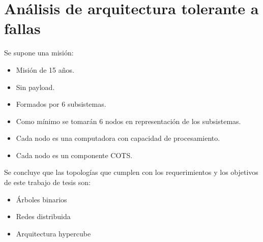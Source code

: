 \section{Análisis de arquitectura tolerante a fallas}
\begin{frame}
	\begin{block}{Se supone una misión:}
		\begin{itemize}
			\item Misión de 15 años. 
			\item Sin payload.
			\item Formados por 6 subsistemas. 
			\item Como mínimo se tomarán 6 nodos en representación de los subsistemas.
			\item Cada nodo es una computadora con capacidad de procesamiento. 
			\item Cada nodo es un componente COTS.
		\end{itemize}
	\end{block}
\end{frame}

\begin{frame}
	Se concluye que las topologías que cumplen con los requerimientos y los objetivos de este trabajo de tesis son:
	\begin{itemize}
		\item Árboles binarios
		\item Redes distribuida
		\item Arquitectura hypercube
	\end{itemize}
\end{frame}

